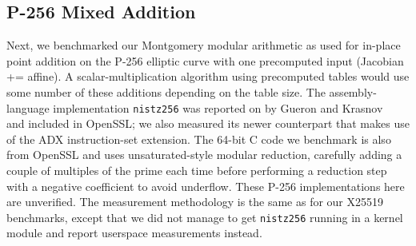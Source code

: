 \documentclass[letterpaper,twocolumn,10pt]{article}
\begin{document}
%
%
%
%
%
%
%
%
%
%

\subsection{P-256 Mixed Addition}

Next, we benchmarked our Montgomery modular arithmetic as used for in-place point addition on the P-256 elliptic curve with one precomputed input (Jacobian += affine).
A scalar-multiplication algorithm using precomputed tables would use some number of these additions depending on the table size.
The assembly-language implementation \texttt{nistz256} was reported on by Gueron and Krasnov~\cite{nistz256} and included in OpenSSL; we also measured its newer counterpart that makes use of the ADX instruction-set extension.
The 64-bit C code we benchmark is also from OpenSSL and uses unsaturated-style modular reduction, carefully adding a couple of multiples of the prime each time before performing a reduction step with a negative coefficient to avoid underflow.
These P-256 implementations here are unverified.
The measurement methodology is the same as for our X25519 benchmarks, except that we did not manage to get \texttt{nistz256} running in a kernel module and report userspace measurements instead.
\end{document}
